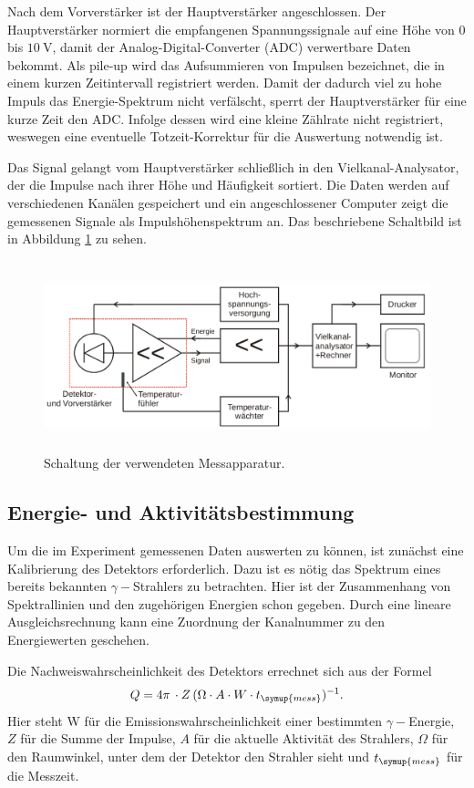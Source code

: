 Nach dem Vorverstärker ist der Hauptverstärker angeschlossen.
Der Hauptverstärker normiert die empfangenen Spannungssignale auf eine Höhe von $0$ bis $\SI{10}{\volt}$, damit der Analog-Digital-Converter (ADC) verwertbare Daten bekommt.
Als pile-up wird das Aufsummieren von Impulsen bezeichnet, die in einem kurzen Zeitintervall registriert werden.
Damit der dadurch viel zu hohe Impuls das Energie-Spektrum nicht verfälscht, sperrt der Hauptverstärker für eine kurze Zeit den ADC.
Infolge dessen wird eine kleine Zählrate nicht registriert, weswegen eine eventuelle Totzeit-Korrektur für die Auswertung notwendig ist.

Das Signal gelangt vom Hauptverstärker schließlich in den Vielkanal-Analysator, der die Impulse nach ihrer Höhe und Häufigkeit sortiert.
Die Daten werden auf verschiedenen Kanälen gespeichert und ein angeschlossener Computer zeigt die gemessenen Signale als Impulshöhenspektrum an.
Das beschriebene Schaltbild ist in Abbildung \ref{fig:Schaltung} zu sehen.
 \begin{figure}
   \centering
   \includegraphics[height=5.5cm]{content/pictures/Schaltung.png}
   \caption{Schaltung der verwendeten Messapparatur.\cite{V18}}
   \label{fig:Schaltung}
 \end{figure}
\subsection{Energie- und Aktivitätsbestimmung}
Um die im Experiment gemessenen Daten auswerten zu können, ist zunächst eine Kalibrierung des Detektors erforderlich.
Dazu ist es nötig das Spektrum eines bereits bekannten $\gamma-$Strahlers zu betrachten.
Hier ist der Zusammenhang von Spektrallinien und den zugehörigen Energien schon gegeben.
Durch eine lineare Ausgleichsrechnung kann eine Zuordnung der Kanalnummer zu den Energiewerten geschehen.

Die Nachweiswahrscheinlichkeit des Detektors errechnet sich aus der Formel
\begin{equation}
\label{eqn:eff} 
Q = 4\pi\,\cdot Z\,(\Omega\cdot A\cdot W\cdot t_{\symup{mess}})^{-1}.
\end{equation}
Hier steht W für die Emissionswahrscheinlichkeit einer bestimmten $\gamma-$Energie, $Z$ für die Summe der Impulse, $A$ für die aktuelle Aktivität des Strahlers, $\Omega$ für den Raumwinkel, unter dem der Detektor den Strahler sieht und $t_{\symup{mess}}$ für die Messzeit.

